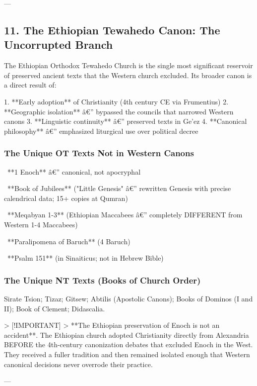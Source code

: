\documentclass[aps,prd,11pt,onecolumn,superscriptaddress,nofootinbib,floatfix]{revtex4-2}
\begin{document}
---


\subsection{11. The Ethiopian Tewahedo Canon: The Uncorrupted Branch}


The Ethiopian Orthodox Tewahedo Church is the single most significant reservoir of preserved ancient texts that the Western church excluded. Its broader canon is a direct result of:


1. **Early adoption** of Christianity (4th century CE via Frumentius)
2. **Geographic isolation** â€'' bypassed the councils that narrowed Western canons
3. **Linguistic continuity** â€'' preserved texts in Ge'ez
4. **Canonical philosophy** â€'' emphasized liturgical use over political decree


\subsubsection{The Unique OT Texts Not in Western Canons}


\textbullet~**1 Enoch** â€'' canonical, not apocryphal

\textbullet~**Book of Jubilees** ("Little Genesis" â€'' rewritten Genesis with precise calendrical data; 15+ copies at Qumran)

\textbullet~**Meqabyan 1-3** (Ethiopian Maccabees â€'' completely DIFFERENT from Western 1-4 Maccabees)

\textbullet~**Paralipomena of Baruch** (4 Baruch)

\textbullet~**Psalm 151** (in Sinaiticus; not in Hebrew Bible)



\subsubsection{The Unique NT Texts (Books of Church Order)}


Sirate Tsion; Tizaz; Gitsew; Abtilis (Apostolic Canons); Books of Dominos (I and II); Book of Clement; Didascalia.


> [!IMPORTANT]
> **The Ethiopian preservation of Enoch is not an accident**. The Ethiopian church adopted Christianity directly from Alexandria BEFORE the 4th-century canonization debates that excluded Enoch in the West. They received a fuller tradition and then remained isolated enough that Western canonical decisions never overrode their practice.


---
\end{document}
